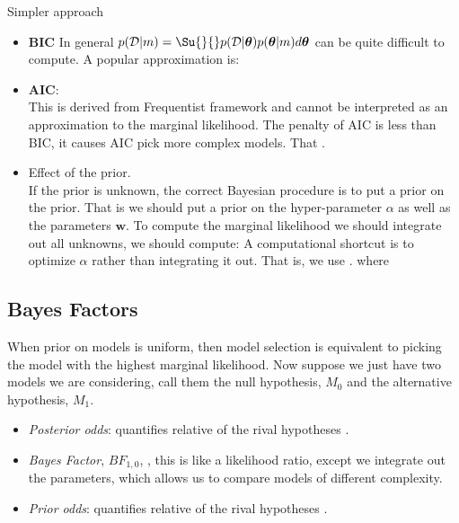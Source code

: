  
Simpler approach
\begin{itemize}
	\item \textbf{BIC} In general $p(\mathcal{D}|m) = \Su{}{}p(\mathcal{D}|\bm{\theta})p(\bm{\theta}|m)d\bm{
\theta}$ can be quite difficult to compute. A popular approximation is:
	\item \textbf{AIC}:
		\\
		This is derived from Frequentist framework and cannot be interpreted as 
		an approximation to the marginal likelihood. The penalty of AIC is less
		than BIC, it causes AIC pick more complex models. That .
	\item Effect of the prior.\\
		If the prior is unknown, the correct Bayesian procedure is to put a prior
		on the prior. That is we should put a prior on the hyper-parameter 
		$\alpha$ as well as the parameters $\bm{w}$. To compute the marginal 
		likelihood we should integrate out all unknowns, we should compute:
		A computational shortcut is to optimize $\alpha$ rather than integrating
		it out. That is, we use .
		where 
\end{itemize}
\subsection{Bayes Factors}
When prior on models is uniform, then model selection is equivalent to picking the model
with the highest marginal likelihood. Now suppose we just have two models we are 
considering, call them the null hypothesis, $M_{0}$ and the alternative hypothesis,
$M_{1}$.\\
\begin{itemize}
    \item \emph{Posterior odds}: quantifies relative  of the rival hypotheses
        .
    \item \emph{Bayes Factor}, $BF_{1,0}$, , 
        this is like a likelihood ratio, except we integrate out the parameters, which 
        allows us to compare models of different complexity.
    \item \emph{Prior odds}: quantifies relative  of the rival hypotheses
        .
\end{itemize}

